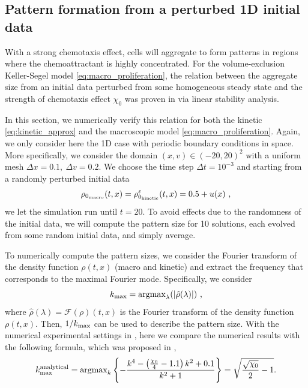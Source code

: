 \documentclass[review,onefignum,onetabnum]{siamart220329}
\newcommand {\dx}   {\Delta x}
\begin{document}
\subsection{Pattern formation from a perturbed 1D initial data}
With a strong chemotaxis effect, cells will aggregate to form patterns in regions where the chemoattractant is highly concentrated. 
For the volume-exclusion Keller-Segel model \cref{eq:macro_proliferation}, the relation between the aggregate size from { an initial data perturbed from some homogeneous steady state} and the strength of chemotaxis effect $\chi_0$ {was proven in \cite{almeida2020treatment} via linear stability analysis. }
{

}
In this section, we numerically verify this relation for both the kinetic \cref{eq:kinetic_approx} and the macroscopic model \cref{eq:macro_proliferation}. 
{Again, we only consider here the 1D case with periodic boundary conditions in space. 
More specifically, we consider the domain $(x,v)\in (-20,20)^2$ with a uniform mesh {$\dx = 0.1,\  \Delta v =  0.2$}. We choose the time step $\Delta t = 10^{-3}$ and starting from a randomly perturbed initial data
\begin{equation*}
    \rho_{0_\textnormal{macro}}(t,x) = \rho_{0_\textnormal{kinetic}}^{\varepsilon}(t,x) = 0.5 + u(x)\ ,
\end{equation*}
we let the simulation run until $t=20$. 
To avoid effects due to the randomness of the initial data, we will compute the pattern size for 10 solutions, each evolved from some random initial data, and simply average. }

To numerically compute the pattern sizes, we consider the Fourier transform of the density function $\rho(t,x)$ (macro and kinetic) and extract the frequency that corresponds to the maximal Fourier mode. 
Specifically, we consider
\begin{equation*}
    k_{\rm max} = \rm{argmax}_{\lambda} (|\hat{\rho}(\lambda)|)\ , 
\end{equation*}
where $\hat{\rho}(\lambda) = \mathcal{F}(\rho)(t,x)$ is the Fourier transform of the density function $\rho(t,x)$. 
Then, $1/k_{\rm max}$ can be used to describe the pattern size. 
{ With the numerical experimental settings in , here we compare the numerical results with the following formula, which was proposed in \cite{almeida2020treatment}, 
$$
k_{\rm max}^{\rm analytical} = {\rm argmax}_{k} \left\{- \frac{k^4 - \left(\frac{\chi_0}{4}-1.1\right)k^2 +0.1}{k^2+1} \right\} = \sqrt{\frac{\sqrt{\chi_0}}{2} - 1}.
$$
} 
\end{document}
